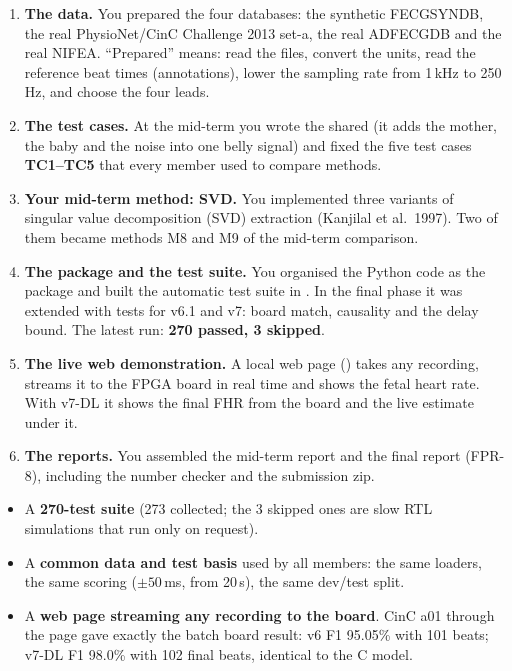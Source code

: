 \documentclass[11pt]{article}
\renewcommand{\file}[1]{\path{#1}}
\begin{document}
\begin{enumerate}
  \item \textbf{The data.} You prepared the four databases: the synthetic FECGSYNDB, the real PhysioNet/CinC Challenge 2013 set-a, the real ADFECGDB and the real NIFEA. ``Prepared'' means: read the files, convert the units, read the reference beat times (annotations), lower the sampling rate from 1\,kHz to 250\,Hz, and choose the four leads.
  \item \textbf{The test cases.} At the mid-term you wrote the shared  (it adds the mother, the baby and the noise into one belly signal) and fixed the five test cases \textbf{TC1--TC5} that every member used to compare methods.
  \item \textbf{Your mid-term method: SVD.} You implemented three variants of singular value decomposition (SVD) extraction (Kanjilal et al.\ 1997). Two of them became methods M8 and M9 of the mid-term comparison.
  \item \textbf{The package and the test suite.} You organised the Python code as the \file{src/fecg} package and built the automatic test suite in \file{tests/}. In the final phase it was extended with tests for v6.1 and v7: board match, causality and the delay bound. The latest run: \textbf{270 passed, 3 skipped}.
  \item \textbf{The live web demonstration.} A local web page (\file{fpga_implementation/webdemo/}) takes any recording, streams it to the FPGA board in real time and shows the fetal heart rate. With v7-DL it shows the final FHR from the board and the live estimate under it.
  \item \textbf{The reports.} You assembled the mid-term report and the final report (FPR-8), including the number checker and the submission zip.
\end{enumerate}

\begin{keyfact}
\begin{itemize}
  \item A \textbf{270-test suite} (273 collected; the 3 skipped ones are slow RTL simulations that run only on request).
  \item A \textbf{common data and test basis} used by all members: the same loaders, the same scoring ($\pm 50$\,ms, from 20\,s), the same dev/test split.
  \item A \textbf{web page streaming any recording to the board}. CinC a01 through the page gave exactly the batch board result: v6 F1 95.05\% with 101 beats; v7-DL F1 98.0\% with 102 final beats, identical to the C model.
\end{itemize}
\end{keyfact}
\end{document}
